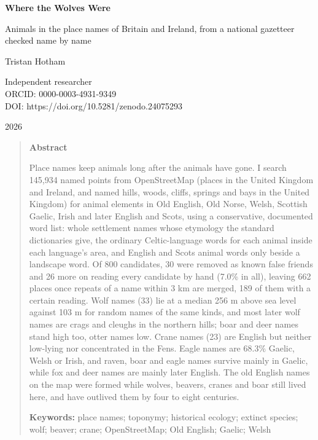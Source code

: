 \documentclass[11pt,a4paper]{article}
\begin{document}
\begin{center}
{\Large\bfseries Where the Wolves Were\par}
\vspace{0.4em}
{\large Animals in the place names of Britain and Ireland, from a national gazetteer checked name by name\par}
\vspace{1.2em}
{\large Tristan Hotham\par}
\vspace{0.3em}
{\small Independent researcher\\
ORCID: 0000-0003-4931-9349\\
DOI: https://doi.org/10.5281/zenodo.24075293\par}
\vspace{0.8em}
2026
\end{center}

\begin{quote}
\small
\begin{center}\textbf{Abstract}\end{center}
Place names keep animals long after the animals have gone. I search 145,934 named points from OpenStreetMap (places in the United Kingdom and Ireland, and named hills, woods, cliffs, springs and bays in the United Kingdom) for animal elements in Old English, Old Norse, Welsh, Scottish Gaelic, Irish and later English and Scots, using a conservative, documented word list: whole settlement names whose etymology the standard dictionaries give, the ordinary Celtic-language words for each animal inside each language's area, and English and Scots animal words only beside a landscape word. Of 800 candidates, 30 were removed as known false friends and 26 more on reading every candidate by hand (7.0\% in all), leaving 662 places once repeats of a name within 3 km are merged, 189 of them with a certain reading. Wolf names (33) lie at a median 256 m above sea level against 103 m for random names of the same kinds, and most later wolf names are crags and cleughs in the northern hills; boar and deer names stand high too, otter names low. Crane names (23) are English but neither low-lying nor concentrated in the Fens. Eagle names are 68.3\% Gaelic, Welsh or Irish, and raven, boar and eagle names survive mainly in Gaelic, while fox and deer names are mainly later English. The old English names on the map were formed while wolves, beavers, cranes and boar still lived here, and have outlived them by four to eight centuries.

\textbf{Keywords:} place names; toponymy; historical ecology; extinct species; wolf; beaver; crane; OpenStreetMap; Old English; Gaelic; Welsh
\end{quote}
\end{document}
